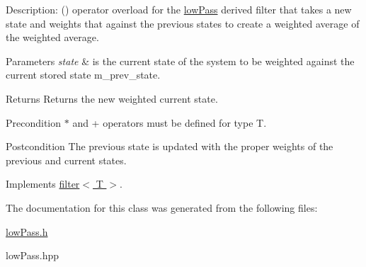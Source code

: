 Description\+: () operator overload for the \hyperlink{classlowPass}{low\+Pass} derived filter that takes a new state and weights that against the previous states to create a weighted average of the weighted average. 
\begin{DoxyParams}{Parameters}
{\em state} & is the current state of the system to be weighted against the current stored state m\+\_\+prev\+\_\+state. \\
\hline
\end{DoxyParams}
\begin{DoxyReturn}{Returns}
Returns the new weighted current state. 
\end{DoxyReturn}
\begin{DoxyPrecond}{Precondition}
$\ast$ and + operators must be defined for type T. 
\end{DoxyPrecond}
\begin{DoxyPostcond}{Postcondition}
The previous state is updated with the proper weights of the previous and current states. 
\end{DoxyPostcond}


Implements \hyperlink{classfilter_ac8ec0fb4a10d10ee5e3133259610e0d2}{filter$<$ T $>$}.



The documentation for this class was generated from the following files\+:\begin{DoxyCompactItemize}
\item 
\hyperlink{lowPass_8h}{low\+Pass.\+h}\item 
low\+Pass.\+hpp\end{DoxyCompactItemize}
